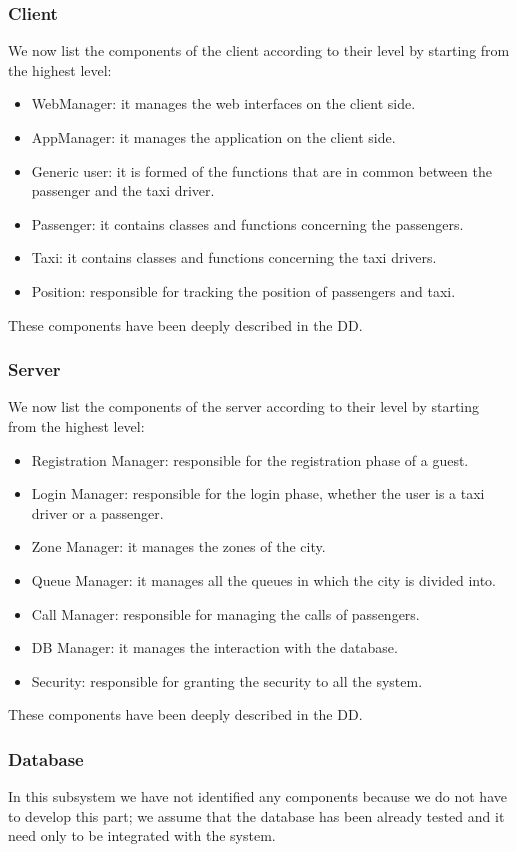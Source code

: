 \subsubsection{Client}
We now list the components of the client according to their level by starting from the highest level:
\begin{itemize}
    \item WebManager: it manages the web interfaces on the client side.
    \item AppManager: it manages the application on the client side.
    \item Generic user: it is formed of the functions that are in common between the passenger and the taxi driver.
    \item Passenger: it contains classes and functions concerning the passengers.
    \item Taxi: it contains classes and functions concerning the taxi drivers.
    \item Position: responsible for tracking the position of passengers and taxi.
\end{itemize}
These components have been deeply described in the DD.

\subsubsection{Server}
We now list the components of the server according to their level by starting from the highest level:
\begin{itemize}
    \item Registration Manager: responsible for the registration phase of a guest.
    \item Login Manager: responsible for the login phase, whether the user is a taxi driver or a passenger.
    \item Zone Manager: it manages the zones of the city.
    \item Queue Manager: it manages all the queues in which the city is divided into.
    \item Call Manager: responsible for managing the calls of passengers.
    \item DB Manager: it manages the interaction with the database.
    \item Security: responsible for granting the security to all the system.
\end{itemize}
These components have been deeply described in the DD.

\subsubsection{Database}
In this subsystem we have not identified any components because we do not have to develop this part; we assume that the database has been already tested and it need only to be integrated with the system.





